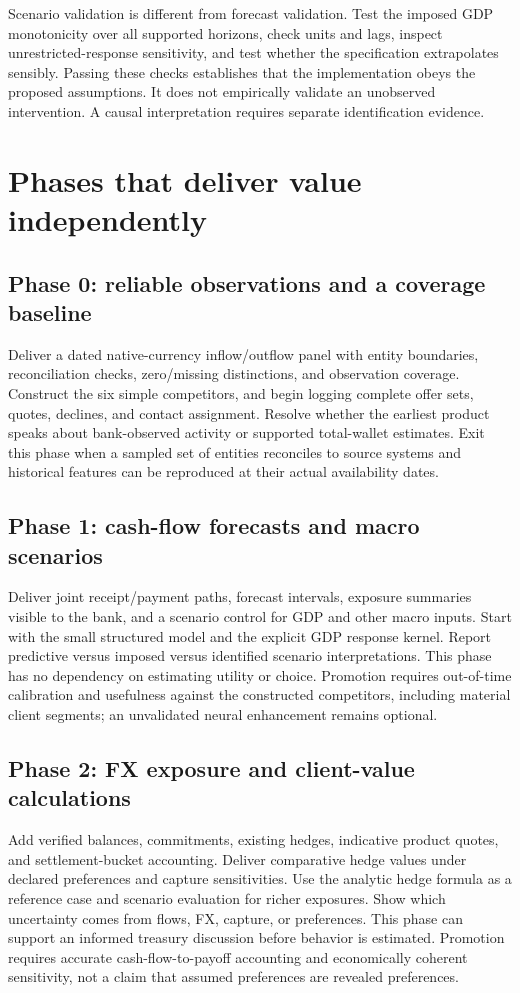 Scenario validation is different from forecast validation. Test the imposed GDP monotonicity over all supported horizons, check units and lags, inspect unrestricted-response sensitivity, and test whether the specification extrapolates sensibly. Passing these checks establishes that the implementation obeys the proposed assumptions. It does not empirically validate an unobserved intervention. A causal interpretation requires separate identification evidence.

\section{Phases that deliver value independently}
\subsection{Phase 0: reliable observations and a coverage baseline}
Deliver a dated native-currency inflow/outflow panel with entity boundaries, reconciliation checks, zero/missing distinctions, and observation coverage. Construct the six simple competitors, and begin logging complete offer sets, quotes, declines, and contact assignment. Resolve whether the earliest product speaks about bank-observed activity or supported total-wallet estimates. Exit this phase when a sampled set of entities reconciles to source systems and historical features can be reproduced at their actual availability dates.

\subsection{Phase 1: cash-flow forecasts and macro scenarios}
Deliver joint receipt/payment paths, forecast intervals, exposure summaries visible to the bank, and a scenario control for GDP and other macro inputs. Start with the small structured model and the explicit GDP response kernel. Report predictive versus imposed versus identified scenario interpretations. This phase has no dependency on estimating utility or choice. Promotion requires out-of-time calibration and usefulness against the constructed competitors, including material client segments; an unvalidated neural enhancement remains optional.

\subsection{Phase 2: FX exposure and client-value calculations}
Add verified balances, commitments, existing hedges, indicative product quotes, and settlement-bucket accounting. Deliver comparative hedge values under declared preferences and capture sensitivities. Use the analytic hedge formula as a reference case and scenario evaluation for richer exposures. Show which uncertainty comes from flows, FX, capture, or preferences. This phase can support an informed treasury discussion before behavior is estimated. Promotion requires accurate cash-flow-to-payoff accounting and economically coherent sensitivity, not a claim that assumed preferences are revealed preferences.

